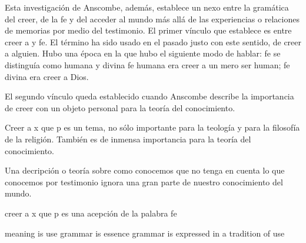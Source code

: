 Esta investigación de Anscombe, además, establece un nexo entre la gramática del
creer, de la fe y del acceder al mundo más allá de las experiencias o relaciones
de memorias por medio del testimonio.
El primer vínculo que establece es entre creer a y fe. 
El término ha sido usado en el pasado justo con este sentido, de creer a
alguien.
Hubo una época en la que hubo el siguiente modo de hablar:
fe se distinguía como humana y divina
fe humana era creer a un mero ser human;
fe divina era creer a Dios.

El segundo vínculo queda establecido cuando Anscombe describe la importancia de
creer con un objeto personal para la teoría del conocimiento.

Creer a x que p es un tema, no sólo importante para la teología y para la
filosofía de la religión. También es de inmensa importancia para la teoría del
conocimiento.

Una decripción o teoría sobre como conocemos que no tenga en cuenta lo que
conocemos por testimonio ignora una gran parte de nuestro conocimiento del
mundo.

creer a x que p es una acepción de la palabra fe


meaning is use
grammar is essence
grammar is expressed in a tradition of use
